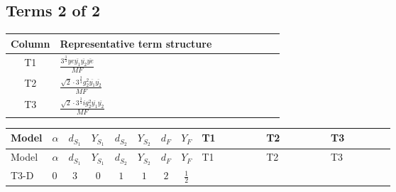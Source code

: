 \documentclass[8pt]{article}
\begin{document}
\begin{landscape}
\subsection*{Terms 2 of 2}
\begin{center}
\begin{tabular}{@{}c >{\raggedright\arraybackslash}p{0.82\linewidth}@{}}
\toprule
Column & Representative term structure \\
\midrule
T1 & \(\displaystyle \frac{3^{\frac{3}{4}} ye \overline{y_{1}} \overline{y_{2}} \overline{ye}}{MF}\) \\
\midrule
T2 & \(\displaystyle \frac{\sqrt{2} \cdot 3^{\frac{3}{4}} g_{2}^{2} \overline{y_{1}} \overline{y_{2}}}{MF}\) \\
\midrule
T3 & \(\displaystyle \frac{\sqrt{2} \cdot 3^{\frac{3}{4}} i g_{2}^{2} \overline{y_{1}} \overline{y_{2}}}{MF}\) \\
\midrule
\bottomrule
\end{tabular}
\end{center}
\smallskip
\tiny
\begin{longtable}{@{}llcccccc >{\raggedright\arraybackslash}p{0.21\linewidth} >{\raggedright\arraybackslash}p{0.21\linewidth} >{\raggedright\arraybackslash}p{0.21\linewidth}@{}}
\toprule
Model & $\alpha$ & $d_{S_1}$ & $Y_{S_1}$ & $d_{S_2}$ & $Y_{S_2}$ & $d_F$ & $Y_F$ & T1 & T2 & T3 \\
\midrule
\endfirsthead
\toprule
Model & $\alpha$ & $d_{S_1}$ & $Y_{S_1}$ & $d_{S_2}$ & $Y_{S_2}$ & $d_F$ & $Y_F$ & T1 & T2 & T3 \\
\midrule
\endhead
T3-D & $0$ & $3$ & $0$ & $1$ & $1$ & $2$ & $\frac{1}{2}$ & \scriptsize\adjustbox{max width=\linewidth}{$\begin{gathered} - \frac{3^{\frac{3}{4}} ye \overline{y_{1}} \overline{y_{2}} \overline{ye}}{12 MF}\end{gathered}$} & \scriptsize\adjustbox{max width=\linewidth}{$\begin{gathered} \frac{\sqrt{2} \cdot 3^{\frac{3}{4}} g_{2}^{2} \overline{y_{1}} \overline{y_{2}}}{6 MF}\end{gathered}$} & \scriptsize\adjustbox{max width=\linewidth}{$\begin{gathered} \frac{\sqrt{2} \cdot 3^{\frac{3}{4}} i g_{2}^{2} \overline{y_{1}} \overline{y_{2}}}{6 MF}\end{gathered}$} \\
\midrule
\bottomrule
\end{longtable}
\clearpage

\end{landscape}
\end{document}
